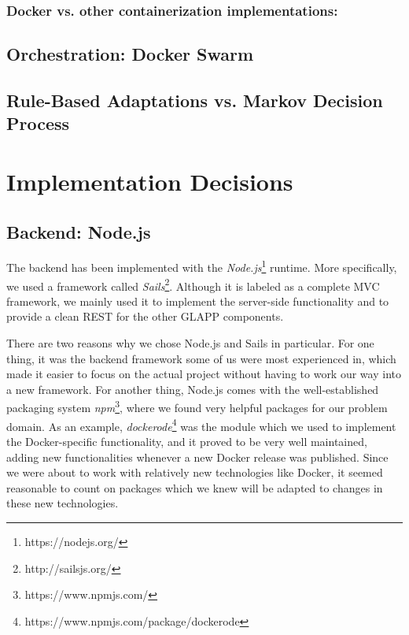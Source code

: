 \documentclass{seal_thesis}
\begin{document}
\subsubsection{Docker vs. other containerization implementations:}

\subsection{Orchestration: Docker Swarm}

\subsection{Rule-Based Adaptations vs. Markov Decision Process}


\section{Implementation Decisions}
\subsection{Backend: Node.js}
The backend has been implemented with the \textit{Node.js}\footnote{https://nodejs.org/} runtime.
More specifically, we used a framework called \textit{Sails}\footnote{http://sailsjs.org/}.
Although it is labeled as a complete MVC framework, we mainly used it to implement the server-side functionality and to provide a clean REST for the other GLAPP components.

There are two reasons why we chose Node.js and Sails in particular.
For one thing, it was the backend framework some of us were most experienced in, which made it easier to focus on the actual project without having to work our way into a new framework.
For another thing, Node.js comes with the well-established packaging system \textit{npm}\footnote{https://www.npmjs.com/}, where we found very helpful packages for our problem domain.
As an example, \textit{dockerode}\footnote{https://www.npmjs.com/package/dockerode} was the module which we used to implement the Docker-specific functionality, and it proved to be very well maintained, adding new functionalities whenever a new Docker release was published.
Since we were about to work with relatively new technologies like Docker, it seemed reasonable to count on packages which we knew will be adapted to changes in these new technologies.
\end{document}
